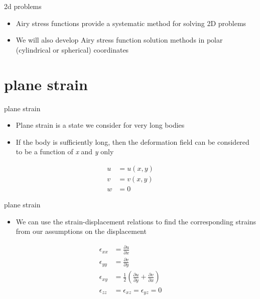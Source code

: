 \documentclass[
  letterpaper,
  ignorenonframetext,
  aspectratio=43,
  handout,
  12pt]{beamer}
\providecommand{\tightlist}{%
  \setlength{\itemsep}{0pt}\setlength{\parskip}{0pt}}
\providecommand{\tightlist}{%
\setlength{\itemsep}{0pt}\setlength{\parskip}{0pt}}
\begin{document}
\begin{frame}{2d problems}
\protect\hypertarget{d-problems-1}{}
\begin{itemize}
\tightlist
\item
  Airy stress functions provide a systematic method for solving 2D
  problems
\item
  We will also develop Airy stress function solution methods in polar
  (cylindrical or spherical) coordinates
\end{itemize}
\end{frame}

\hypertarget{plane-strain}{%
\section{plane strain}\label{plane-strain}}

\begin{frame}{plane strain}
\protect\hypertarget{plane-strain-1}{}
\begin{itemize}
\tightlist
\item
  Plane strain is a state we consider for very long bodies
\item
  If the body is sufficiently long, then the deformation field can be
  considered to be a function of \emph{x} and \emph{y} only
\end{itemize}

\[\begin{aligned}
    u &= u(x,y)\\
    v &= v(x,y)\\
    w &= 0
\end{aligned}\]
\end{frame}

\begin{frame}{plane strain}
\protect\hypertarget{plane-strain-2}{}
\begin{itemize}
\tightlist
\item
  We can use the strain-displacement relations to find the corresponding
  strains from our assumptions on the displacement
\end{itemize}

\[\begin{aligned}
    \epsilon_{xx} &= \frac{\partial u}{\partial x}\\
    \epsilon_{yy} &= \frac{\partial v}{\partial y}\\
    \epsilon_{xy} &= \frac{1}{2}\left(\frac{\partial u}{\partial y} + \frac{\partial v}{\partial x}\right)\\
    \epsilon_{zz} &= \epsilon_{xz} = \epsilon_{yz} = 0
\end{aligned}\]
\end{frame}
\end{document}
